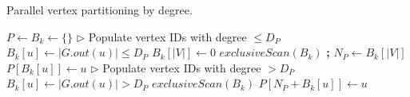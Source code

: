 \begin{algorithm}[!hbt]
\caption{Parallel vertex partitioning by degree.}
\label{alg:partition}
\begin{algorithmic}[1]

\Statex

  \State $P \gets B_k \gets \{\}$
  \State $\rhd$ Populate vertex IDs with degree $\leq D_P$
    \State $B_k[u] \gets |G.out(u)| \leq D_P$
  \EndFor
  \State $B_k[|V|] \gets 0$
  \State $exclusiveScan(B_k)$ \textbf{;} $N_P \gets B_k[|V|]$
     $P[B_k[u]] \gets u$
    \EndIf
  \EndFor
  \State $\rhd$ Populate vertex IDs with degree $> D_P$
    \State $B_k[u] \gets |G.out(u)| > D_P$
  \EndFor
  \State $exclusiveScan(B_k)$
     $P[N_P + B_k[u]] \gets u$
    \EndIf
  \EndFor
  \State {} \label{alg:partition--return}
\EndFunction
\end{algorithmic}
\end{algorithm}
